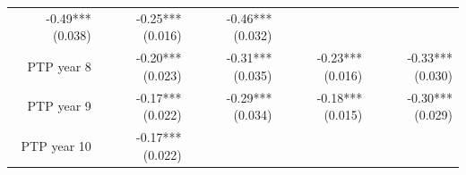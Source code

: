 \documentclass[]{article}
\begin{document}
\begin{longtable}[c]{@{}rrrrr@{}}
\begin{minipage}[t]{0.16\columnwidth}
-0.49*** (0.038)
\strut\end{minipage} &
\begin{minipage}[t]{0.18\columnwidth}\raggedleft\strut
-0.25*** (0.016)
\strut\end{minipage} &
\begin{minipage}[t]{0.15\columnwidth}\raggedleft\strut
-0.46*** (0.032)
\strut\end{minipage}\tabularnewline
\begin{minipage}[t]{0.17\columnwidth}\raggedleft\strut
PTP year 8
\strut\end{minipage} &
\begin{minipage}[t]{0.20\columnwidth}\raggedleft\strut
-0.20*** (0.023)
\strut\end{minipage} &
\begin{minipage}[t]{0.16\columnwidth}\raggedleft\strut
-0.31*** (0.035)
\strut\end{minipage} &
\begin{minipage}[t]{0.18\columnwidth}\raggedleft\strut
-0.23*** (0.016)
\strut\end{minipage} &
\begin{minipage}[t]{0.15\columnwidth}\raggedleft\strut
-0.33*** (0.030)
\strut\end{minipage}\tabularnewline
\begin{minipage}[t]{0.17\columnwidth}\raggedleft\strut
PTP year 9
\strut\end{minipage} &
\begin{minipage}[t]{0.20\columnwidth}\raggedleft\strut
-0.17*** (0.022)
\strut\end{minipage} &
\begin{minipage}[t]{0.16\columnwidth}\raggedleft\strut
-0.29*** (0.034)
\strut\end{minipage} &
\begin{minipage}[t]{0.18\columnwidth}\raggedleft\strut
-0.18*** (0.015)
\strut\end{minipage} &
\begin{minipage}[t]{0.15\columnwidth}\raggedleft\strut
-0.30*** (0.029)
\strut\end{minipage}\tabularnewline
\begin{minipage}[t]{0.17\columnwidth}\raggedleft\strut
PTP year 10
\strut\end{minipage} &
\begin{minipage}[t]{0.20\columnwidth}\raggedleft\strut
-0.17*** (0.022)
\strut\end{minipage} &
\begin{minipage}[t]{0.16\columnwidth}\raggedleft\strut

\end{minipage}
\end{longtable}
\end{document}
